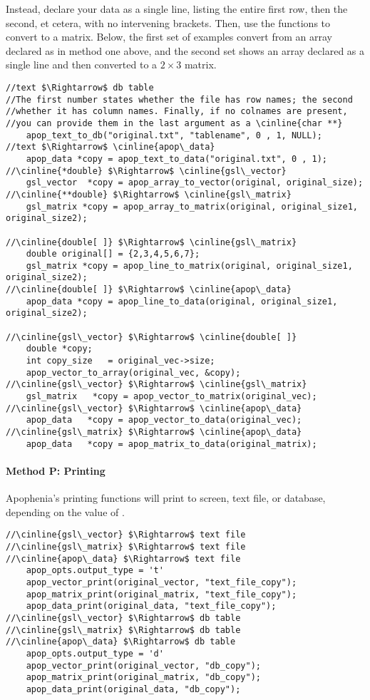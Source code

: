 Instead, declare your data as a single line, listing the entire first
row, then the second, et cetera, with no intervening brackets. Then, use
the  functions to convert to a matrix. Below, the
first set of examples convert from an array declared as in method one
above, and the second set shows an array declared as a single line and
then converted to a $2 \times 3$ matrix.
\begin{lstlisting}
//text $\Rightarrow$ db table
//The first number states whether the file has row names; the second
//whether it has column names. Finally, if no colnames are present,
//you can provide them in the last argument as a \cinline{char **}
    apop_text_to_db("original.txt", "tablename", 0 , 1, NULL);
//text $\Rightarrow$ \cinline{apop\_data}
    apop_data *copy = apop_text_to_data("original.txt", 0 , 1);
//\cinline{*double} $\Rightarrow$ \cinline{gsl\_vector}
    gsl_vector  *copy = apop_array_to_vector(original, original_size);
//\cinline{**double} $\Rightarrow$ \cinline{gsl\_matrix}
    gsl_matrix *copy = apop_array_to_matrix(original, original_size1, original_size2);

//\cinline{double[ ]} $\Rightarrow$ \cinline{gsl\_matrix}
    double original[] = {2,3,4,5,6,7};
    gsl_matrix *copy = apop_line_to_matrix(original, original_size1, original_size2);
//\cinline{double[ ]} $\Rightarrow$ \cinline{apop\_data}
    apop_data *copy = apop_line_to_data(original, original_size1, original_size2);

//\cinline{gsl\_vector} $\Rightarrow$ \cinline{double[ ]}
    double *copy;
    int copy_size   = original_vec->size;
    apop_vector_to_array(original_vec, &copy);
//\cinline{gsl\_vector} $\Rightarrow$ \cinline{gsl\_matrix}
    gsl_matrix   *copy = apop_vector_to_matrix(original_vec);
//\cinline{gsl\_vector} $\Rightarrow$ \cinline{apop\_data}
    apop_data   *copy = apop_vector_to_data(original_vec);
//\cinline{gsl\_matrix} $\Rightarrow$ \cinline{apop\_data}
    apop_data   *copy = apop_matrix_to_data(original_matrix);
\end{lstlisting}

\paragraph{Method P: Printing}
  
Apophenia's printing functions will print to screen, text file, or
database, depending on the value of .
\begin{lstlisting}
//\cinline{gsl\_vector} $\Rightarrow$ text file
//\cinline{gsl\_matrix} $\Rightarrow$ text file
//\cinline{apop\_data} $\Rightarrow$ text file
    apop_opts.output_type = 't'
    apop_vector_print(original_vector, "text_file_copy");
    apop_matrix_print(original_matrix, "text_file_copy");
    apop_data_print(original_data, "text_file_copy");
//\cinline{gsl\_vector} $\Rightarrow$ db table
//\cinline{gsl\_matrix} $\Rightarrow$ db table
//\cinline{apop\_data} $\Rightarrow$ db table
    apop_opts.output_type = 'd'
    apop_vector_print(original_vector, "db_copy");
    apop_matrix_print(original_matrix, "db_copy");
    apop_data_print(original_data, "db_copy");
\end{lstlisting}


